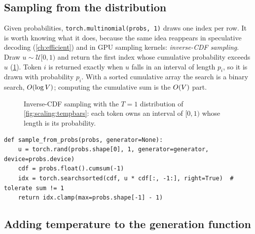 \subsection{Sampling from the distribution}\label{sec:scaling:sample}

Given probabilities, \texttt{torch.multinomial(probs, 1)} draws one index per row. It is worth
knowing what it does, because the same idea reappears in speculative decoding (\cref{ch:efficient})
and in GPU sampling kernels: \emph{inverse-CDF sampling}. Draw $u \sim \mathcal{U}[0,1)$ and return
the first index whose cumulative probability exceeds $u$ (\cref{fig:scaling:icdf}). Token $i$ is
returned exactly when $u$ falls in an interval of length $p_i$, so it is drawn with probability
$p_i$. With a sorted cumulative array the search is a binary search, $O(\log V)$; computing the
cumulative sum is the $O(V)$ part.

\begin{figure}[t]
\centering
{}
\caption{Inverse-CDF sampling with the $T=1$ distribution of \cref{fig:scaling:tempbars}: each
token owns an interval of $[0,1)$ whose length is its probability.}
\label{fig:scaling:icdf}
\end{figure}

\begin{lstlisting}[caption={Inverse-CDF sampling, one token per row (Lab 32, Task 3).},label={lst:scaling:icdf}]
def sample_from_probs(probs, generator=None):
    u = torch.rand(probs.shape[0], 1, generator=generator, device=probs.device)
    cdf = probs.float().cumsum(-1)
    idx = torch.searchsorted(cdf, u * cdf[:, -1:], right=True)  # tolerate sum != 1
    return idx.clamp(max=probs.shape[-1] - 1)
\end{lstlisting}

\subsection{Adding temperature to the generation function}\label{sec:scaling:addtemp}


